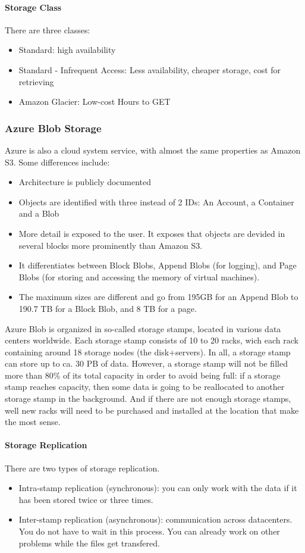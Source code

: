 \paragraph{Storage Class}
There are three classes:
\begin{itemize}
    \item Standard: high availability
    \item Standard - Infrequent Access: Less availability, cheaper storage, cost for retrieving
    \item Amazon Glacier: Low-cost Hours to GET
\end{itemize}

\subsubsection{Azure Blob Storage}
Azure is also a cloud system service, with almost the same properties as Amazon S3. Some differences include:
\begin{itemize}
    \item Architecture is publicly documented
    \item Objects are identified with three instead of 2 IDs: An Account, a Container and a Blob
    \item More detail is exposed to the user. It exposes that objects are devided in several blocks more prominently than Amazon S3.
    \item It differentiates between Block Blobs, Append Blobs (for logging), and Page Blobs (for storing and accessing the memory of virtual machines).
    \item The maximum sizes are different and go from 195GB for an Append Blob to 190.7 TB for a Block Blob, and 8 TB for a page.
\end{itemize}

Azure Blob is organized in so-called storage stamps, located in various data centers worldwide. Each storage stamp consists of 10 to 20 racks, wich each rack containing around 18 storage nodes (the disk+servers). In all, a storage stamp can store up to ca. 30 PB of data. However, a storage stamp will not be filled more than 80\% of its total capacity in order to avoid being full: if a storage stamp reaches capacity, then some data is going to be reallocated to another storage stamp in the background. And if there are not enough storage stamps, well new racks will need to be purchased and installed at the location that make the most sense.

\paragraph{Storage Replication}
There are two types of storage replication.
\begin{itemize}
    \item Intra-stamp replication (synchronous): you can only work with the data if it has been stored twice or three times.
    \item Inter-stamp replication (asynchronous): communication across datacenters. You do not have to wait in this process. You can already work on other problems while the files get transfered.
\end{itemize}

